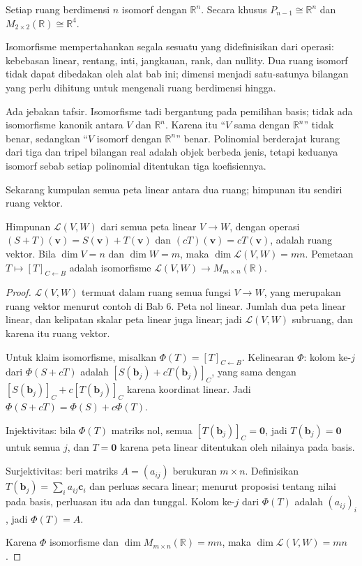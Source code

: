 \begin{akibat}
Setiap ruang berdimensi $n$ isomorf dengan $\mathbb{R}^{n}$. Secara khusus
$P_{n-1}\cong\mathbb{R}^{n}$ dan $M_{2\times2}(\mathbb{R})\cong\mathbb{R}^{4}$.
\end{akibat}

Isomorfisme mempertahankan segala sesuatu yang didefinisikan dari operasi: kebebasan
linear, rentang, inti, jangkauan, rank, dan nullity. Dua ruang isomorf tidak dapat dibedakan
oleh alat bab ini; dimensi menjadi satu-satunya bilangan yang perlu dihitung untuk mengenali
ruang berdimensi hingga.

Ada jebakan tafsir. Isomorfisme tadi bergantung pada pemilihan
basis; tidak ada isomorfisme kanonik antara $V$ dan $\mathbb{R}^{n}$. Karena itu ``$V$ sama
dengan $\mathbb{R}^{n}$'' tidak benar, sedangkan ``$V$ isomorf dengan $\mathbb{R}^{n}$''
benar.
Polinomial berderajat kurang dari tiga dan tripel bilangan real adalah objek berbeda jenis,
tetapi keduanya isomorf sebab setiap polinomial ditentukan tiga koefisiennya.

Sekarang kumpulan semua peta linear antara dua ruang; himpunan itu sendiri ruang vektor.

\begin{teorema}
Himpunan $\mathcal{L}(V,W)$ dari semua peta linear $V\to W$, dengan operasi
$(S+T)(\mathbf{v})=S(\mathbf{v})+T(\mathbf{v})$ dan $(cT)(\mathbf{v})=cT(\mathbf{v})$,
adalah
ruang vektor. Bila $\dim V=n$ dan $\dim W=m$, maka $\dim\mathcal{L}(V,W)=mn$. Pemetaan
$T\mapsto[T]_{C\leftarrow B}$ adalah isomorfisme $\mathcal{L}(V,W)\to M_{m\times n}(\mathbb{R})$.
\end{teorema}

\begin{proof}
$\mathcal{L}(V,W)$ termuat dalam ruang semua fungsi $V\to W$, yang merupakan ruang vektor
menurut contoh di Bab 6. Peta nol linear. Jumlah dua peta linear linear, dan kelipatan
skalar
peta linear juga linear; jadi $\mathcal{L}(V,W)$ subruang, dan karena itu ruang vektor.

Untuk klaim isomorfisme, misalkan $\Phi(T)=[T]_{C\leftarrow B}$. Kelinearan $\Phi$: kolom
ke-$j$ dari $\Phi(S+cT)$ adalah $[S(\mathbf{b}_{j})+cT(\mathbf{b}_{j})]_{C}$, yang sama
dengan
$[S(\mathbf{b}_{j})]_{C}+c[T(\mathbf{b}_{j})]_{C}$ karena koordinat linear. Jadi
$\Phi(S+cT)=\Phi(S)+c\Phi(T)$.

Injektivitas: bila $\Phi(T)$ matriks nol, semua $[T(\mathbf{b}_{j})]_{C}=\mathbf{0}$, jadi
$T(\mathbf{b}_{j})=\mathbf{0}$ untuk semua $j$, dan $T=\mathbf{0}$ karena peta linear
ditentukan oleh nilainya pada basis.

Surjektivitas: beri matriks $A=(a_{ij})$ berukuran $m\times n$. Definisikan
$T(\mathbf{b}_{j})=\sum_{i}a_{ij}\mathbf{c}_{i}$ dan perluas secara linear; menurut
proposisi
tentang nilai pada basis, perluasan itu ada dan tunggal. Kolom ke-$j$ dari $\Phi(T)$ adalah
$(a_{ij})_{i}$, jadi $\Phi(T)=A$.

Karena $\Phi$ isomorfisme dan $\dim M_{m\times n}(\mathbb{R})=mn$, maka
$\dim\mathcal{L}(V,W)=mn$.
\end{proof}

